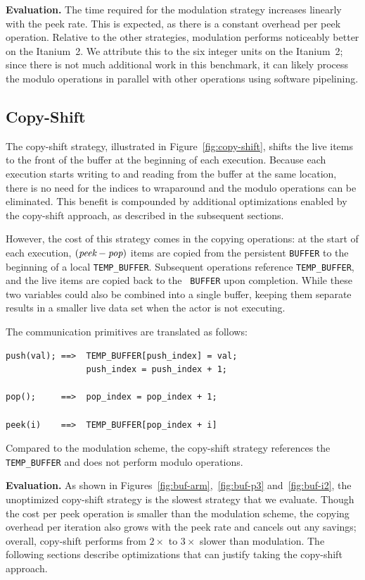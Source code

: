 \documentclass{sigplanconf}
\begin{document}
{\bf Evaluation.}  The time required for the modulation strategy
increases linearly with the peek rate.  This is expected, as there is
a constant overhead per peek operation.  Relative to the other
strategies, modulation performs noticeably better on the Itanium~2.
We attribute this to the six integer units on the Itanium~2; since
there is not much additional work in this benchmark, it can likely
process the modulo operations in parallel with other operations using
software pipelining.

\subsection{Copy-Shift}

The copy-shift strategy, illustrated in Figure~\ref{fig:copy-shift},
shifts the live items to the front of the buffer at the beginning of
each execution.  Because each execution starts writing to and reading from
the buffer at the same location, there is no need for the indices to
wraparound and the modulo operations can be eliminated.  This benefit
is compounded by additional optimizations enabled by the copy-shift
approach, as described in the subsequent sections.

However, the cost of this strategy comes in the copying operations: at
the start of each execution, $(\mbox{\it peek} - \mbox{\it pop})$
items are copied from the persistent {\tt BUFFER} to the beginning of
a local {\tt TEMP\_BUFFER}.  Subsequent operations reference
{\tt TEMP\_BUFFER}, and the live items are copied back to the {\tt
BUFFER} upon completion.  While these two variables could also be
combined into a single buffer, keeping them separate results in a
smaller live data set when the actor is not executing.

The communication primitives are translated as follows:

{\scriptsize
\begin{verbatim}
push(val); ==>  TEMP_BUFFER[push_index] = val;
                push_index = push_index + 1;

pop();     ==>  pop_index = pop_index + 1;

peek(i)    ==>  TEMP_BUFFER[pop_index + i]
\end{verbatim}}
\noindent Compared to the modulation scheme, the copy-shift strategy
references the {\tt TEMP\_BUFFER} and does not perform modulo
operations.

{\bf Evaluation.}  As shown in
Figures~\ref{fig:buf-arm},~\ref{fig:buf-p3} and~\ref{fig:buf-i2},
the unoptimized copy-shift strategy is the slowest strategy that we
evaluate.  Though the cost per peek operation is smaller than the
modulation scheme, the copying overhead per iteration also grows with
the peek rate and cancels out any savings; overall, copy-shift
performs from $2\times$ to $3\times$ slower than modulation.  The following sections
describe optimizations that can justify taking the copy-shift
approach.
\end{document}
